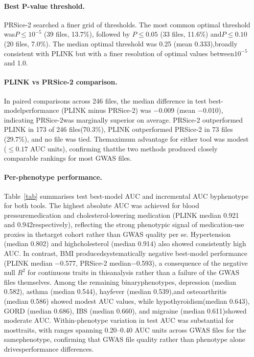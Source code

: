 \documentclass[11pt,a4paper]{article}
\begin{document}
\paragraph{Best P-value threshold.}PRSice-2 searched a finer grid of thresholds. The most common optimal threshold was$P \leq 10^{-5}$ (39 files, 13.7\%), followed by $P \leq 0.05$ (33 files, 11.6\%) and$P \leq 0.10$ (20 files, 7.0\%). The median optimal threshold was 0.25 (mean 0.333),broadly consistent with PLINK but with a finer resolution of optimal values between$10^{-5}$ and 1.0.

\paragraph{PLINK vs PRSice-2 comparison.}In paired comparisons across 246 files, the median difference in test best-modelperformance (PLINK minus PRSice-2) was $-$0.009 (mean $-$0.010), indicating PRSice-2was marginally superior on average. PRSice-2 outperformed PLINK in 173 of 246 files(70.3\%), PLINK outperformed PRSice-2 in 73 files (29.7\%), and no file was tied. Themaximum advantage for either tool was modest ($\leq 0.17$ AUC units), confirming thatthe two methods produced closely comparable rankings for most GWAS files.

\paragraph{Per-phenotype performance.}Table~\ref{tab} summarises test best-model AUC and incremental AUC byphenotype for both tools. The highest absolute AUC was achieved for blood pressuremedication and cholesterol-lowering medication (PLINK median 0.921 and 0.942respectively), reflecting the strong phenotypic signal of medication-use proxies in thetarget cohort rather than GWAS quality per se. Hypertension (median 0.802) and highcholesterol (median 0.914) also showed consistently high AUC. In contrast, BMI producedsystematically negative best-model performance (PLINK median $-$0.577, PRSice-2 median$-$0.593), a consequence of the negative null $R^{2}$ for continuous traits in thisanalysis rather than a failure of the GWAS files themselves. Among the remaining binaryphenotypes, depression (median 0.582), asthma (median 0.544), hayfever (median 0.539),and osteoarthritis (median 0.586) showed modest AUC values, while hypothyroidism(median 0.643), GORD (median 0.686), IBS (median 0.660), and migraine (median 0.611)showed moderate AUC. Within-phenotype variation in test AUC was substantial for mosttraits, with ranges spanning 0.20--0.40 AUC units across GWAS files for the samephenotype, confirming that GWAS file quality rather than phenotype alone drivesperformance differences.
\end{document}
